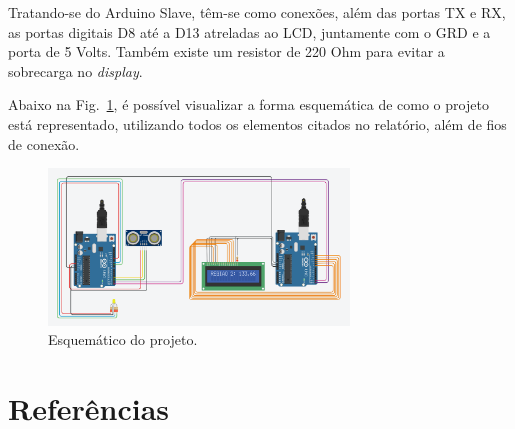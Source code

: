 \documentclass[conference]{IEEEtran}
\begin{document}
    Tratando-se do Arduino Slave, têm-se como conexões, além das portas TX e RX, as portas digitais D8 até
a D13 atreladas ao LCD, juntamente com o GRD e a porta de 5 Volts. Também existe um resistor de 220 Ohm para
evitar a sobrecarga no \emph{display}.

Abaixo na Fig.~\ref{fig5}, é possível visualizar a forma esquemática de como o projeto está 
representado, utilizando todos os elementos citados no relatório, além de fios de conexão.

\begin{figure}[htbp]
    \centerline{
        \includegraphics[width=8cm]{imagens/esquematico.png}
        }
    \caption{Esquemático do projeto.}
    \label{fig5}
    \end{figure}

\section{Referências}
\end{document}
